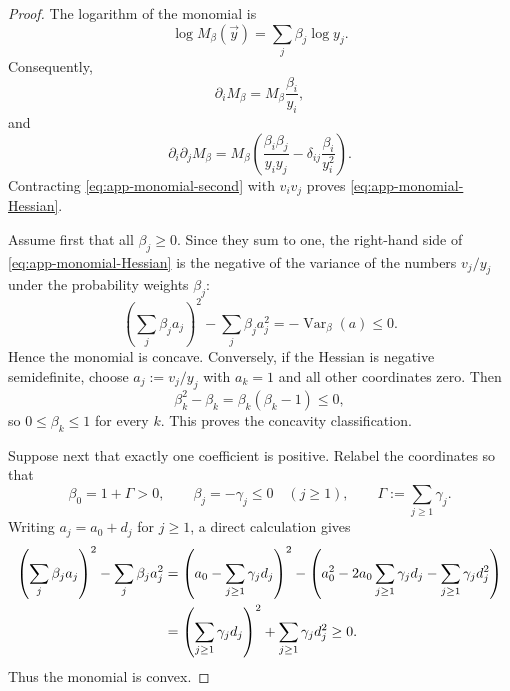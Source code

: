 \documentclass[aps,pra,11pt,onecolumn,nofootinbib,tightenlines]{revtex4-2}
\theoremstyle{definition}
\begin{document}
\begin{proof}
The logarithm of the monomial is
\begin{equation}
 \log M_\beta(\vec y)=\sum_j\beta_j\log y_j.
 \label{eq:app-log-monomial}
\end{equation}
Consequently,
\begin{equation}
 \partial_iM_\beta=M_\beta\frac{\beta_i}{y_i},
 \label{eq:app-monomial-first}
\end{equation}
and
\begin{equation}
 \partial_i\partial_jM_\beta
 =M_\beta\left(
   \frac{\beta_i\beta_j}{y_iy_j}
   -\delta_{ij}\frac{\beta_i}{y_i^2}
 \right).
 \label{eq:app-monomial-second}
\end{equation}
Contracting \eqref{eq:app-monomial-second} with $v_iv_j$ proves \eqref{eq:app-monomial-Hessian}.

Assume first that all $\beta_j\geq0$.  Since they sum to one, the right-hand side of \eqref{eq:app-monomial-Hessian} is the negative of the variance of the numbers $v_j/y_j$ under the probability weights $\beta_j$:
\begin{equation}
 \left(\sum_j\beta_ja_j\right)^2-\sum_j\beta_ja_j^2
 =-\operatorname{Var}_\beta(a)\leq0.
 \label{eq:app-monomial-variance}
\end{equation}
Hence the monomial is concave.  Conversely, if the Hessian is negative semidefinite, choose $a_j:=v_j/y_j$ with $a_k=1$ and all other coordinates zero.  Then
\begin{equation}
 \beta_k^2-\beta_k=\beta_k(\beta_k-1)\leq0,
 \label{eq:app-concave-diagonal-test}
\end{equation}
so $0\leq\beta_k\leq1$ for every $k$.  This proves the concavity classification.

Suppose next that exactly one coefficient is positive.  Relabel the coordinates so that
\begin{equation}
 \beta_0=1+\Gamma>0,
 \qquad
 \beta_j=-\gamma_j\leq0\quad(j\geq1),
 \qquad
 \Gamma:=\sum_{j\geq1}\gamma_j.
 \label{eq:app-convex-beta-param}
\end{equation}
Writing $a_j=a_0+d_j$ for $j\geq1$, a direct calculation gives
\begin{align}
 \left(\sum_j\beta_ja_j\right)^2-
 \sum_j\beta_ja_j^2
 &=\left(a_0-\sum_{j\geq1}\gamma_jd_j\right)^2
   -\left(a_0^2-2a_0\sum_{j\geq1}\gamma_jd_j
          -\sum_{j\geq1}\gamma_jd_j^2\right)
 \notag\\
 &=\left(\sum_{j\geq1}\gamma_jd_j\right)^2
   +\sum_{j\geq1}\gamma_jd_j^2
 \geq0.
 \label{eq:app-convex-monomial-square}
\end{align}
Thus the monomial is convex.


\end{proof}
\end{document}
